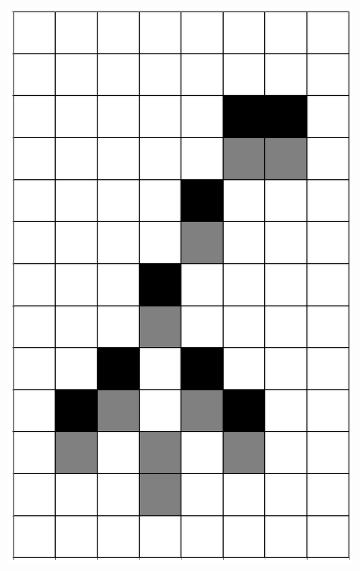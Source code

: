 \documentclass[12pt]{article}
\numberwithin{figure}{section} %
\begin{document}
\begin{figure}[H]
\begin{subfigure}{0.3\textwidth}
     		\includegraphics[angle=270,width=\linewidth]{Section4/13.1}
     		\subcaption{}
  	\end{subfigure}
        \begin{subfigure}{0.3\textwidth}
     		\centering

\end{subfigure}
\end{figure}
\end{document}
